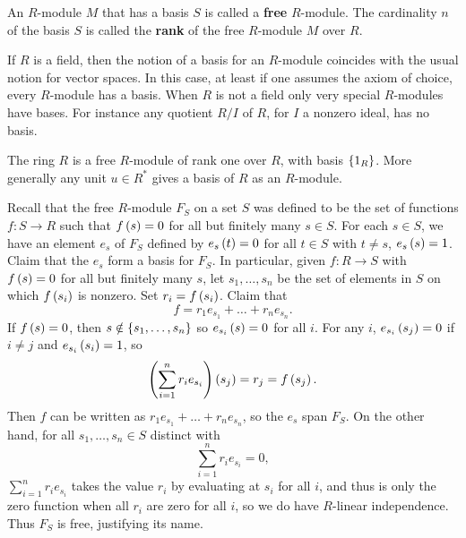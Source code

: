 \begin{definition}
An $ R $-module $ M $ that has a basis $ S $ is called a \textbf{free} $ R $-module. The cardinality $ n $ of the basis $ S $ is called the \textbf{rank} of the free $ R $-module $ M $ over $ R $.
\end{definition}


\begin{remark}
If $ R $ is a field, then the notion of a basis for an $ R $-module coincides with the usual notion for vector spaces. In this case, at least if one assumes the axiom of choice, every $ R $-module has a basis. When $ R $ is not a field only very special $ R $-modules have bases. For instance any quotient $ R / I $ of $ R $, for $ I $ a nonzero ideal, has no basis.
\end{remark}

\begin{example*}
The ring $ R $ is a free $ R $-module of rank one over $ R $, with basis $ \left\{ 1_R \right\} $. More generally any unit $ u \in R^* $ gives a basis of $ R $ as an $ R $-module.
\end{example*}

Recall that the free $ R $-module $ F_S $ on a set $ S $ was defined to be the set of functions $ f : S \to R $ such that $ f\left( s \right) = 0 $ for all but finitely many $ s \in S $. For each $ s \in S $, we have an element $ e_s $ of $ F_S $ defined by $ e_s\left( t \right) = 0 $ for all $ t \in S $ with $ t \ne s $, $ e_s\left( s \right) = 1 $. Claim that the $ e_s $ form a basis for $ F_S $. In particular, given $ f : R \to S $ with $ f\left( s \right) = 0 $ for all but finitely many $ s $, let $ s_1, \dots, s_n $ be the set of elements in $ S $ on which $ f\left( s_i \right) $ is nonzero. Set $ r_i = f\left( s_i \right) $. Claim that
$$ f = r_1e_{s_1} + \dots + r_ne_{s_n}. $$
If $ f\left( s \right) = 0 $, then $ s \notin \left\{ s_1, \dots, s_n \right\} $ so $ e_{s_i}\left( s \right) = 0 $ for all $ i $. For any $ i $, $ e_{s_i}\left( s_j \right) = 0 $ if $ i \ne j $ and $ e_{s_i}\left( s_i \right) = 1 $, so
$$ \left( \sum_{i = 1}^n r_ie_{s_i} \right)\left( s_j \right) = r_j = f\left( s_j \right). $$
Then $ f $ can be written as $ r_1e_{s_1} + \dots + r_ne_{s_n} $, so the $ e_s $ span $ F_S $. On the other hand, for all $ s_1, \dots, s_n \in S $ distinct with
$$ \sum_{i = 1}^n r_ie_{s_i} = 0, $$
$ \sum_{i = 1}^n r_ie_{s_i} $ takes the value $ r_i $ by evaluating at $ s_i $ for all $ i $, and thus is only the zero function when all $ r_i $ are zero for all $ i $, so we do have $ R $-linear independence. Thus $ F_S $ is free, justifying its name.

